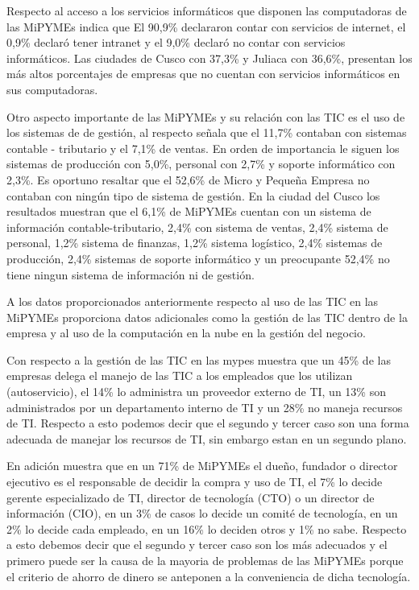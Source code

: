 Respecto al acceso a los servicios inform\'aticos que disponen las computadoras de
las MiPYMEs \cite{inei1} indica que El 90,9\% declararon contar con servicios de
internet, el 0,9\% declar\'o tener intranet y el 9,0\% declar\'o no contar con
servicios inform\'aticos. Las ciudades de Cusco con 37,3\% y Juliaca con 36,6\%,
presentan los m\'as altos porcentajes de empresas que no cuentan con servicios
inform\'aticos en sus computadoras.

Otro aspecto importante de las MiPYMEs y su relaci\'on con las TIC es el uso de los
sistemas de de gesti\'on, al respecto \citep{inei1} se\~nala que el 11,7\% contaban
con sistemas contable - tributario y el 7,1\% de ventas. En orden de importancia
le siguen los sistemas de producci\'on con 5,0\%, personal con 2,7\% y soporte inform\'atico
con 2,3\%. Es oportuno resaltar que el 52,6\% de Micro y Peque\~na Empresa no contaban
con ning\'un tipo de sistema de gesti\'on. En la ciudad del Cusco los resultados
muestran que el 6,1\% de MiPYMEs cuentan con un sistema de informaci\'on contable-tributario,
2,4\% con sistema de ventas, 2,4\% sistema de personal, 1,2\% sistema de finanzas,
1,2\% sistema log\'istico, 2,4\% sistemas de producci\'on, 2,4\% sistemas de soporte
inform\'atico y un preocupante 52,4\% no tiene ningun sistema de informaci\'on ni de
gesti\'on.

A los datos proporcionados anteriormente respecto al uso de las TIC en las MiPYMEs
\cite{ipsos} proporciona datos adicionales como la gesti\'on de las TIC dentro
de la empresa y al uso de la computaci\'on en la nube en la gesti\'on del negocio.

Con respecto a la gesti\'on de las TIC en las mypes \citep{ipsos} muestra que un
45\% de las empresas delega el manejo de las TIC a los empleados que los utilizan
(autoservicio), el 14\% lo administra un proveedor externo de TI, un 13\% son administrados
por un departamento interno de TI y un 28\% no maneja recursos de TI. Respecto a
esto podemos decir que el segundo y tercer caso son una forma adecuada de manejar
los recursos de TI, sin embargo estan en un segundo plano.

En adici\'on \cite{ipsos} muestra que en un 71\% de MiPYMEs el due\~no, fundador o director
ejecutivo es el responsable de decidir la compra y uso de TI, el 7\% lo decide
gerente especializado de TI, director de tecnolog\'ia (CTO) o un director de informaci\'on
(CIO), en un 3\% de casos lo decide un comit\'e de tecnolog\'ia, en un 2\% lo decide
cada empleado, en un 16\% lo deciden otros y 1\% no sabe. Respecto a esto debemos
decir que el segundo y tercer caso son los m\'as adecuados y el primero puede ser la
causa de la mayoria de problemas de las MiPYMEs porque el criterio de ahorro de dinero
se anteponen a la conveniencia de dicha tecnolog\'ia.

